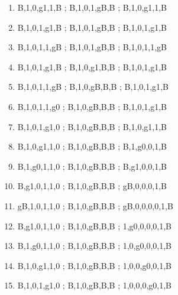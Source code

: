 \documentclass[leqno]{article}
\begin{document}
\begin{enumerate}
                    \item {}        {B,1,0,g1,1,B ; B,1,0,1,gB,B ; B,1,0,g1,1,B}
                    \item {}        {B,1,0,1,g1,B ; B,1,0,1,gB,B ; B,1,0,1,g1,B}
                    \item {}      {B,1,0,1,1,gB ; B,1,0,1,gB,B ; B,1,0,1,1,gB}
                    \item {}         {B,1,0,1,g1,B ; B,1,0,g1,B,B ; B,1,0,1,g1,B}
                    \item {}        {B,1,0,1,1,gB ; B,1,0,gB,B,B ; B,1,0,1,g1,B}
                    \item {}        {B,1,0,1,1,g0 ; B,1,0,gB,B,B ; B,1,0,1,g1,B}
                    \item {}        {B,1,0,1,g1,0 ; B,1,0,gB,B,B ; B,1,0,g1,1,B}
                    \item {}        {B,1,0,g1,1,0 ; B,1,0,gB,B,B ; B,1,g0,0,1,B}
                    \item {}        {B,1,g0,1,1,0 ; B,1,0,gB,B,B ; B,g1,0,0,1,B}
                    \item {}       {B,g1,0,1,1,0 ; B,1,0,gB,B,B ; gB,0,0,0,1,B}
                    \item {}     {gB,1,0,1,1,0 ; B,1,0,gB,B,B ; gB,0,0,0,0,1,B}
                    \item {}      {B,g1,0,1,1,0 ; B,1,0,gB,B,B ; 1,g0,0,0,0,1,B}
                    \item {}      {B,1,g0,1,1,0 ; B,1,0,gB,B,B ; 1,0,g0,0,0,1,B}
                    \item {}      {B,1,0,g1,1,0 ; B,1,0,gB,B,B ; 1,0,0,g0,0,1,B}
                    \item {}      {B,1,0,1,g1,0 ; B,1,0,gB,B,B ; 1,0,0,0,g0,1,B}

\end{enumerate}
\end{document}
